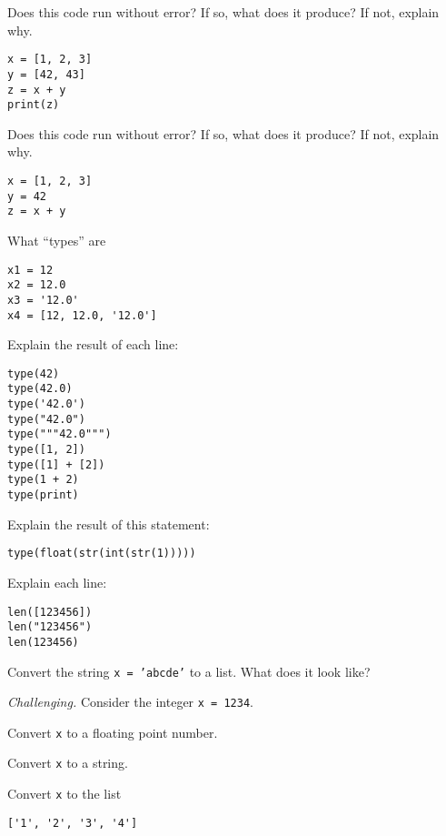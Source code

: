 \documentclass[11pt]{exam}
\begin{document}
\begin{questions}
\item Does this code run without error?  If so, what does it produce?  If not, explain why.
\begin{verbatim}
x = [1, 2, 3]
y = [42, 43]
z = x + y
print(z) 
\end{verbatim}

\item Does this code run without error?  If so, what does it produce?  If not, explain why.
\begin{verbatim}
x = [1, 2, 3]
y = 42 
z = x + y
\end{verbatim}

\item What ``types'' are 
\begin{verbatim}
x1 = 12
x2 = 12.0 
x3 = '12.0'
x4 = [12, 12.0, '12.0']
\end{verbatim} 

\item Explain the result of each line:  
\begin{verbatim}
type(42)
type(42.0)
type('42.0')
type("42.0")
type("""42.0""")
type([1, 2])
type([1] + [2])
type(1 + 2)
type(print)
\end{verbatim}

\item Explain the result of this statement:    
\begin{verbatim}
type(float(str(int(str(1)))))
\end{verbatim}

\item Explain each line:  
\begin{verbatim}
len([123456])
len("123456")
len(123456)    
\end{verbatim}


\item Convert the string \texttt{x = 'abcde'} to a list.  What does it look like?  

\item {\it Challenging.\/}
Consider the integer \texttt{x = 1234}. 
\begin{parts}
\item Convert \texttt{x} to a floating point number.
\item Convert \texttt{x} to a string.
\item Convert \texttt{x} to the list 
\begin{verbatim}
['1', '2', '3', '4'] 
\end{verbatim} 

\end{parts} 


\end{questions}
\end{document}
